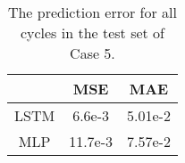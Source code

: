 \begin{table}[ht!]
    \centering
    \caption{The prediction error for all cycles in the test set of Case 5.}
    \begin{tabular}{c | c c}
                    & \ac{MSE}  & \ac{MAE}  \\ \hline
        \ac{LSTM}   & 6.6e-3         & 5.01e-2         \\
        \ac{MLP}    & 11.7e-3         & 7.57e-2
    \end{tabular}
    \label{tab:case5-test-eval}
\end{table}